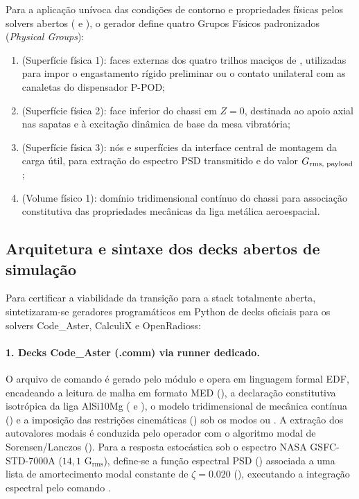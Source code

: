 Para a aplicação unívoca das condições de contorno e propriedades físicas pelos solvers abertos ( e ), o gerador define quatro Grupos Físicos padronizados (\textit{Physical Groups}):
\begin{enumerate}
  \item {} (Superfície física 1): faces externas dos quatro trilhos maciços de \rail{}, utilizadas para impor o engastamento rígido preliminar ou o contato unilateral com as canaletas do dispensador P-POD;
  \item {} (Superfície física 2): face inferior do chassi em $Z = 0$, destinada ao apoio axial nas sapatas e à excitação dinâmica de base da mesa vibratória;
  \item {} (Superfície física 3): nós e superfícies da interface central de montagem da carga útil, para extração do espectro PSD transmitido e do valor $G_{\text{rms, payload}}$;
  \item {} (Volume físico 1): domínio tridimensional contínuo do chassi para associação constitutiva das propriedades mecânicas da liga metálica aeroespacial.
\end{enumerate}

\subsection{Arquitetura e sintaxe dos decks abertos de simulação}
\label{subsec:decks-abertos}

Para certificar a viabilidade da transição para a stack totalmente aberta, sintetizaram-se geradores programáticos em Python de decks oficiais para os solvers Code\_Aster, CalculiX e OpenRadioss:

\paragraph{1. Decks Code\_Aster (.comm) via runner dedicado.}
O arquivo de comando é gerado pelo módulo  e opera em linguagem formal EDF, encadeando a leitura de malha em formato MED (), a declaração constitutiva isotrópica da liga AlSi10Mg ( e ), o modelo tridimensional de mecânica contínua () e a imposição das restrições cinemáticas () sob os modos  ou . A extração dos autovalores modais é conduzida pelo operador  com o algoritmo modal de Sorensen/Lanczos (). Para a resposta estocástica sob o espectro NASA GSFC-STD-7000A ($14{,}1\text{ G}_{\text{rms}}$), define-se a função espectral PSD () associada a uma lista de amortecimento modal constante de $\zeta = \num{0.020}$ (), executando a integração espectral pelo comando .

